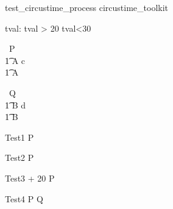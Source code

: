 \begin{zsection}
   \SECTION test\_circustime\_process \parents circustime\_toolkit
\end{zsection}

\begin{axdef}
   tval: \nat
\where
   tval > 20 \land tval<30
\end{axdef}


\begin{circus}
    \circprocess\ P \circdef  \circbegin  \\
    \t1 A \circdef c \then \Skip \\
    \t1 \circspot A \\
    \circend
\end{circus}



\begin{circus}
    \circprocess\ Q \circdef  \circbegin  \\
    \t1 B \circdef d \then \Skip \\
    \t1 \circspot B \\
    \circend
\end{circus}

\begin{circus}
   \circprocess Test1 \circdef  {} \rcirctime \circstartby P  \\
\end{circus}


\begin{circus}
   \circprocess Test2 \circdef  {}  \rcirctime \circstartby P  \\
\end{circus}

\begin{circus}
   \circprocess Test3 \circdef  {} + 20 \rcirctime \circstartby P  \\
\end{circus}


\begin{circus}
   \circprocess Test4 \circdef  {} \rcirctime \circstartby P  \circseq Q\\
\end{circus}

